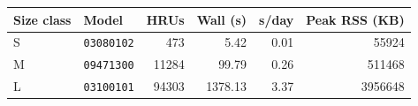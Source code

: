 \begin{tabular*}{\textwidth}{@{\extracolsep{\fill}}llrrrr@{}}
\toprule
Size class & Model & HRUs & Wall (s) & s/day & Peak RSS (KB) \\
\midrule
S & \texttt{03080102} & 473 & 5.42 & 0.01 & 55924 \\
M & \texttt{09471300} & 11284 & 99.79 & 0.26 & 511468 \\
L & \texttt{03100101} & 94303 & 1378.13 & 3.37 & 3956648 \\
\bottomrule
\end{tabular*}
